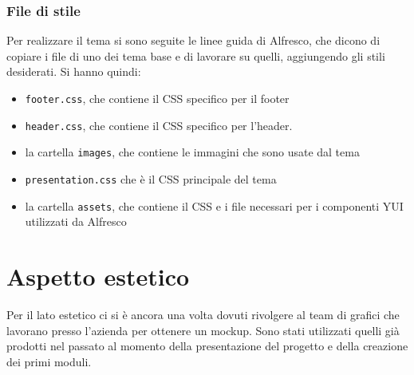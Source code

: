 \subsubsection{File di stile}
Per realizzare il tema si sono seguite le linee guida di Alfresco, che dicono di copiare i file di uno dei tema base e di lavorare su quelli, aggiungendo gli stili desiderati. Si hanno quindi:
\begin{itemize}
\item \texttt{footer.css}, che contiene il CSS specifico per il footer
\item \texttt{header.css}, che contiene il CSS specifico per l'header.
\item la cartella \texttt{images}, che contiene le immagini che sono usate dal tema
\item \texttt{presentation.css} che è il CSS principale del tema
\item la cartella \texttt{assets}, che contiene il CSS e i file necessari per i componenti \gls{YUI} utilizzati da Alfresco
\end{itemize}
\section{Aspetto estetico}
Per il lato estetico ci si è ancora una volta dovuti rivolgere al team di grafici che lavorano presso l'azienda per ottenere un mockup. Sono stati utilizzati quelli già prodotti nel passato al momento della presentazione del progetto e della creazione dei primi moduli.
